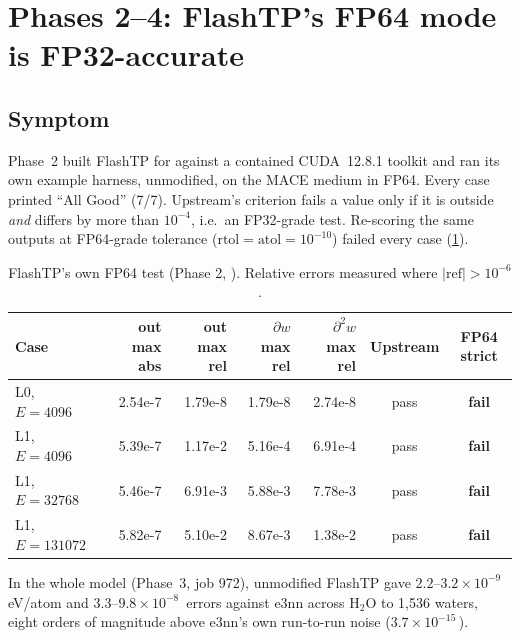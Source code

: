 \section{Phases 2--4: FlashTP's FP64 mode is FP32-accurate}
\label{sec:precision}

\subsection{Symptom}
Phase~2 built FlashTP for  against a contained CUDA~12.8.1 toolkit and ran its own example harness, unmodified, on the MACE medium  in FP64. Every case printed ``All Good'' (7/7). Upstream's criterion fails a value only if it is outside  \emph{and} differs by more than $10^{-4}$, i.e.\ an FP32-grade test. Re-scoring the same outputs at FP64-grade tolerance ($\text{rtol}=\text{atol}=10^{-10}$) failed every case (\cref{tab:flashcheck}).

\begin{table}[h]
\centering
\caption{FlashTP's own FP64 test (Phase 2, ). Relative errors measured where $|\text{ref}|>10^{-6}$.}
\label{tab:flashcheck}
\small
\begin{tabular}{lrrrrcc}
\toprule
Case & out max abs & out max rel & $\partial w$ max rel & $\partial^2 w$ max rel & Upstream & FP64 strict \\
\midrule
L0, $E=4096$ & 2.54e-7 & 1.79e-8 & 1.79e-8 & 2.74e-8 & pass & \textbf{fail} \\
L1, $E=4096$ & 5.39e-7 & 1.17e-2 & 5.16e-4 & 6.91e-4 & pass & \textbf{fail} \\
L1, $E=32768$ & 5.46e-7 & 6.91e-3 & 5.88e-3 & 7.78e-3 & pass & \textbf{fail} \\
L1, $E=131072$ & 5.82e-7 & 5.10e-2 & 8.67e-3 & 1.38e-2 & pass & \textbf{fail} \\
\bottomrule
\end{tabular}
\end{table}

In the whole model (Phase~3, job 972), unmodified FlashTP gave $2.2$--$3.2\times10^{-9}$\,eV/atom and $3.3$--$9.8\times10^{-8}$\,\eVA{} errors against e3nn across H$_2$O to 1{,}536 waters, eight orders of magnitude above e3nn's own run-to-run noise ($3.7\times10^{-15}$\,\eVA).

